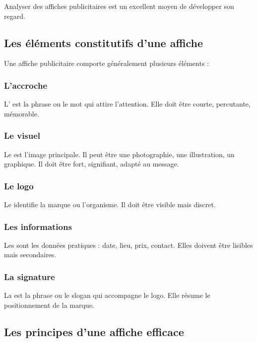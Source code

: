 Analyser des affiches publicitaires est un excellent moyen de développer son regard.

\subsection{Les éléments constitutifs d'une affiche}

Une affiche publicitaire comporte généralement plusieurs éléments :

\subsubsection{L'accroche}

L' est la phrase ou le mot qui attire l'attention. Elle doit être courte, percutante, mémorable.

\subsubsection{Le visuel}

Le  est l'image principale. Il peut être une photographie, une illustration, un graphique. Il doit être fort, signifiant, adapté au message.

\subsubsection{Le logo}

Le  identifie la marque ou l'organisme. Il doit être visible mais discret.

\subsubsection{Les informations}

Les  sont les données pratiques : date, lieu, prix, contact. Elles doivent être lisibles mais secondaires.

\subsubsection{La signature}

La  est la phrase ou le slogan qui accompagne le logo. Elle résume le positionnement de la marque.

\subsection{Les principes d'une affiche efficace}

